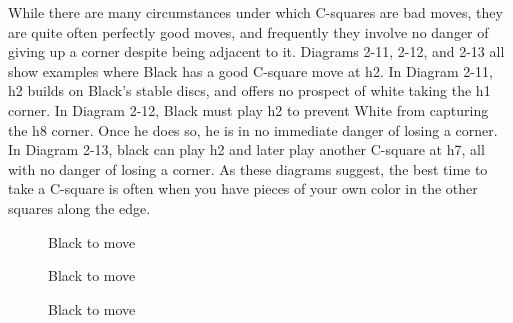 \documentclass[a4paper,12pt]{book}
\begin{document}
While there are many circumstances under which C-squares are bad moves, they are quite often perfectly good moves, and frequently they involve no danger of giving up a corner despite being adjacent to it. Diagrams 2-11, 2-12, and 2-13 all show examples where Black has a good C-square move at h2. In Diagram 2-11, h2 builds on Black's stable discs, and offers no prospect of white taking the h1 corner. In Diagram 2-12, Black must play h2 to prevent White from capturing the h8 corner. Once he does so, he is in no immediate danger of losing a corner. In Diagram 2-13, black can play h2 and later play another C-square at h7, all with no danger of losing a corner. As these diagrams suggest, the best time to take a C-square is often when you have pieces of your own color in the other squares along the edge.
\addtolength{\belowcaptionskip}{-8pt}
\begin{figure}[h]
\begin{center}
\begin{minipage}[t]{.32\textwidth}
\begin{othelloboard}{.6}
\dotmarkings
{}
\end{othelloboard}
\caption{Black to move}
\end{minipage}
\hfill
\begin{minipage}[t]{.32\textwidth}
\begin{othelloboard}{.6}
\dotmarkings
{}
\end{othelloboard}
\caption{Black to move}
\end{minipage}
\hfill
\begin{minipage}[t]{.32\textwidth}
\begin{othelloboard}{.6}
\dotmarkings
{}
\end{othelloboard}
\caption{Black to move}
\end{minipage}
\end{center}
\end{figure}
\end{document}
